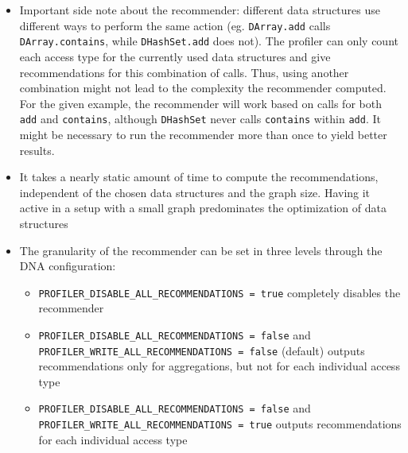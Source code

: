 \begin{itemize}
		\item Important side note about the recommender: different data structures use different
			ways to perform the same action (eg. \texttt{DArray.add} calls
			\texttt{DArray.contains}, while \texttt{DHashSet.add} does not). The profiler can only
			count each access type for the currently used data structures and give recommendations
			for this combination of calls. Thus, using another combination might not lead to the
			complexity the recommender computed. For the given example, the recommender will work
			based on calls for both \texttt{add} and \texttt{contains}, although \texttt{DHashSet}
			never calls \texttt{contains} within \texttt{add}. It might be necessary to run the
			recommender more than once to yield better results.
		\item It takes a nearly static amount of time to compute the recommendations,
			independent of the chosen data structures and the graph size. Having it active in a
			setup with a small graph predominates the optimization of data structures
		\item The granularity of the recommender can be set in three levels through the DNA
			configuration:
		\begin{itemize}
			\item \texttt{PROFILER\_DISABLE\_ALL\_RECOMMENDATIONS = true} completely disables the
				recommender
			\item \texttt{PROFILER\_DISABLE\_ALL\_RECOMMENDATIONS = false} and
				\texttt{PROFILER\_WRITE\_ALL\_RECOMMENDATIONS = false} (default) outputs
				recommendations only for aggregations, but not for each individual access type
			\item \texttt{PROFILER\_DISABLE\_ALL\_RECOMMENDATIONS = false} and
				\texttt{PROFILER\_WRITE\_ALL\_RECOMMENDATIONS = true} outputs recommendations for each
				individual access type
		\end{itemize}
	\end{itemize}

